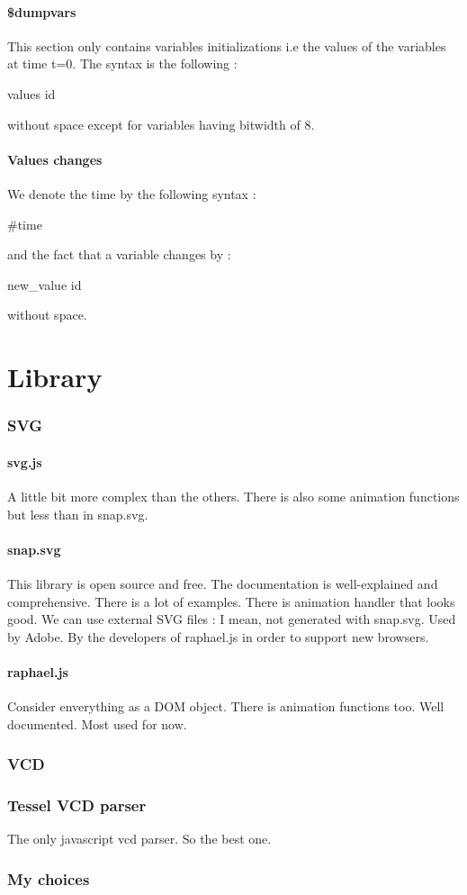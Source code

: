 \documentclass[a4paper]{article}
\begin{document}
\subsection{\$dumpvars}
This section only contains variables initializations i.e the values of the variables at time t=0.
The syntax is the following : 
\begin{center}
values id
\end{center}
without space except for variables having bitwidth of 8.
\subsection{Values changes}
We denote the time by the following syntax :
\begin{center}
\#time
\end{center}
and the fact that a variable changes by :
\begin{center}
new\_value id
\end{center}
without space.

\newpage
\part{Library}

\section{SVG}

\subsection{svg.js}
A little bit more complex than the others. There is also some animation functions but less than in snap.svg. 

\subsection{snap.svg}
This library is open source and free. The documentation is well-explained and comprehensive. There is a lot of examples. 
There is animation handler that looks good. We can use external SVG files : I mean, not generated with snap.svg. Used by Adobe. By the developers of raphael.js in order to support new browsers.

\subsection{raphael.js}
Consider enverything as a DOM object. There is animation functions too. Well documented. Most used for now.

\section{VCD}

\section{Tessel VCD parser}
The only javascript vcd parser. So the best one. 

\section{My choices}
\end{document}
